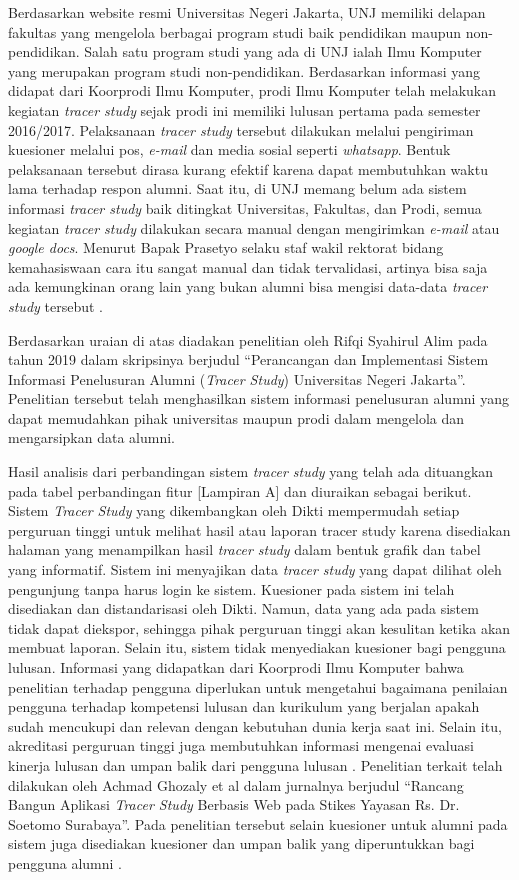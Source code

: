 Berdasarkan website resmi Universitas Negeri Jakarta, UNJ memiliki delapan fakultas yang mengelola berbagai program studi baik pendidikan maupun non-pendidikan. Salah satu program studi yang ada di UNJ ialah Ilmu Komputer yang merupakan program studi non-pendidikan. Berdasarkan informasi yang didapat dari Koorprodi Ilmu Komputer, prodi Ilmu Komputer telah melakukan kegiatan \textit{tracer study} sejak prodi ini memiliki lulusan pertama pada semester 2016/2017. Pelaksanaan \textit{tracer study} tersebut dilakukan melalui pengiriman kuesioner melalui pos, \textit{e-mail} dan media sosial seperti \textit{whatsapp}. Bentuk pelaksanaan tersebut dirasa kurang efektif karena dapat membutuhkan waktu lama terhadap respon alumni. Saat itu, di UNJ memang belum ada sistem informasi \textit{tracer study} baik ditingkat Universitas, Fakultas, dan Prodi, semua kegiatan \textit{tracer study} dilakukan secara manual dengan mengirimkan \textit{e-mail} atau \textit{google docs}. Menurut Bapak Prasetyo selaku staf wakil rektorat bidang kemahasiswaan cara itu sangat manual dan tidak tervalidasi, artinya bisa saja ada kemungkinan orang lain yang bukan alumni bisa mengisi data-data \textit{tracer study} tersebut \cite{Rifqi}. 

Berdasarkan uraian di atas diadakan penelitian oleh Rifqi Syahirul Alim pada tahun 2019 dalam skripsinya berjudul “Perancangan dan Implementasi Sistem Informasi Penelusuran Alumni (\textit{Tracer Study}) Universitas Negeri Jakarta”. Penelitian tersebut telah menghasilkan sistem informasi penelusuran alumni yang dapat memudahkan pihak universitas maupun prodi dalam mengelola dan mengarsipkan data alumni.

Hasil analisis dari perbandingan sistem \textit{tracer study} yang telah ada dituangkan pada tabel perbandingan fitur [Lampiran A] dan diuraikan sebagai berikut. Sistem \textit{Tracer Study} yang dikembangkan oleh Dikti mempermudah setiap perguruan tinggi untuk melihat hasil atau laporan tracer study karena disediakan halaman yang menampilkan hasil \textit{tracer study} dalam bentuk grafik dan tabel yang informatif. Sistem ini menyajikan data \textit{tracer study} yang dapat dilihat oleh pengunjung tanpa harus login ke sistem. Kuesioner pada sistem ini telah disediakan dan distandarisasi oleh Dikti. Namun, data yang ada pada sistem tidak dapat diekspor, sehingga pihak perguruan tinggi akan kesulitan ketika akan membuat laporan. Selain itu, sistem tidak menyediakan kuesioner bagi pengguna lulusan. Informasi yang didapatkan dari Koorprodi Ilmu Komputer bahwa penelitian terhadap pengguna diperlukan untuk mengetahui bagaimana penilaian pengguna terhadap kompetensi lulusan dan kurikulum yang berjalan apakah sudah mencukupi dan relevan dengan kebutuhan dunia kerja saat ini. Selain itu, akreditasi perguruan tinggi juga membutuhkan informasi mengenai evaluasi kinerja lulusan dan umpan balik dari pengguna lulusan \cite{BorangIlkom}. Penelitian terkait telah dilakukan oleh Achmad Ghozaly et al dalam jurnalnya berjudul “Rancang Bangun Aplikasi \textit{Tracer Study} Berbasis Web pada Stikes Yayasan Rs. Dr. Soetomo Surabaya”. Pada penelitian tersebut selain kuesioner untuk alumni pada sistem juga disediakan kuesioner dan umpan balik yang diperuntukkan bagi pengguna alumni \cite{Ghozaly}. 

